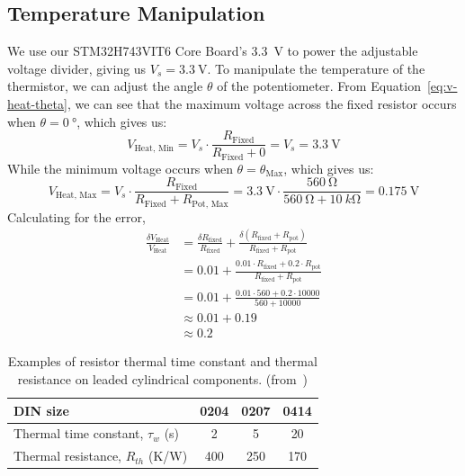 \documentclass[12pt,a4paper]{article}
\begin{document}
\subsection{Temperature Manipulation}
We use our STM32H743VIT6 Core Board's \SI{3.3}{\volt} to power the adjustable voltage divider, giving us $V_s=\SI{3.3}{\volt}$. To manipulate the temperature of the thermistor, we can adjust the angle $\theta$ of the potentiometer. From Equation~\ref{eq:v-heat-theta}, we can see that the maximum voltage across the fixed resistor occurs when $\theta = \SI{0}{\degree}$, which gives us:
\begin{equation*}
    V_{\text{Heat, Min}} = V_s \cdot \frac{R_{\text{Fixed}}}{R_{\text{Fixed}} + 0} = V_s = \SI{3.3}{\volt}
\end{equation*}
While the minimum voltage occurs when $\theta = \theta_{\text{Max}}$, which gives us:
\begin{equation*}
    V_{\text{Heat, Max}} = V_s \cdot \frac{R_{\text{Fixed}}}{R_{\text{Fixed}} + R_{\text{Pot, Max}}} = \SI{3.3}{\volt} \cdot \frac{\SI{560}{\ohm}}{\SI{560}{\ohm} + \SI{10}{k\ohm}} = \SI{0.175}{\volt}
\end{equation*}
Calculating for the error,
\begin{align*}
    \frac{\delta V_{\text{Heat}}}{V_{\text{Heat}}} &=  \frac{\delta R_\text{fixed}}{R_\text{fixed}} + \frac{\delta (R_\text{fixed} + R_\text{pot})}{R_\text{fixed} + R_\text{pot}} \\
    &= 0.01 + \frac{0.01 \cdot R_\text{fixed} + 0.2 \cdot R_\text{pot}}{R_\text{fixed} + R_\text{pot}} \\
    &= 0.01 + \frac{0.01 \cdot 560 + 0.2 \cdot 10000}{560 + 10000} \\
    &\approx 0.01 + 0.19 \\
    &\approx 0.2
\end{align*}

\begin{table}[h!]
\centering
\begin{tabular}{lccc}
\hline
\textbf{DIN size} & \textbf{0204} & \textbf{0207} & \textbf{0414} \\
\hline
Thermal time constant, $\tau_w$ (s) & 2 & 5 & 20 \\
Thermal resistance, $R_{th}$ (K/W)  & 400 & 250 & 170 \\
\hline
\end{tabular}
\caption{Examples of resistor thermal time constant and thermal resistance on leaded cylindrical components. (from~\cite{thermal-resistance})}
\label{tab:thermal-resistance}
\end{table}
\end{document}
